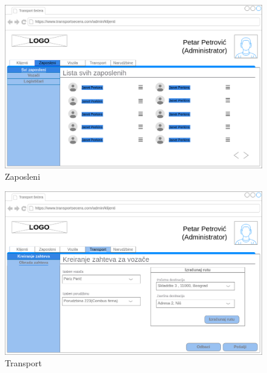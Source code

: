 \begin{figure}[H]
	\centering
	\includegraphics[scale=0.25]{Slike/KorisnickiInterfejs/AdministratorZaposleni.png}
	\caption{Zaposleni}
	\label{fig:prijavakvara}
\end{figure}
\begin{figure}[H]
	\centering
	\includegraphics[scale=0.25]{Slike/KorisnickiInterfejs/AdminTransportKreiranjeZahteva.png}
	\caption{Transport}
	\label{fig:transportkreiranje}
\end{figure}



